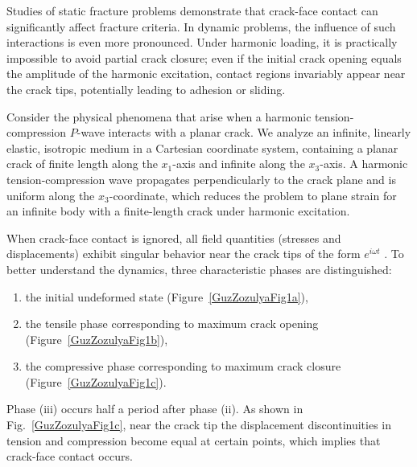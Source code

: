 Studies of static fracture problems demonstrate that crack-face contact can significantly affect fracture criteria.  
In dynamic problems, the influence of such interactions is even more pronounced.  
Under harmonic loading, it is practically impossible to avoid partial crack closure; even if the initial crack opening equals the amplitude of the harmonic excitation, contact regions invariably appear near the crack tips, potentially leading to adhesion or sliding.

Consider the physical phenomena that arise when a harmonic tension-compression $P$-wave interacts with a planar crack.  
We analyze an infinite, linearly elastic, isotropic medium in a Cartesian coordinate system, containing a planar crack of finite length along the $x_1$-axis and infinite along the $x_3$-axis.  
A harmonic tension-compression wave propagates perpendicularly to the crack plane and is uniform along the $x_3$-coordinate, which reduces the problem to plane strain for an infinite body with a finite-length crack under harmonic excitation.

When crack-face contact is ignored, all field quantities (stresses and displacements) exhibit singular behavior near the crack tips of the form $e^{i \omega t}$ \cite{GuzZozulyaRef15,GuzZozulyaRef24,GuzZozulyaRef27,GuzZozulyaRef28}.  
To better understand the dynamics, three characteristic phases are distinguished:

\begin{enumerate}[label=(\roman*)]
	\item the initial undeformed state (Figure~\ref{GuzZozulyaFig1a}),
	\item the tensile phase corresponding to maximum crack opening (Figure~\ref{GuzZozulyaFig1b}),
	\item the compressive phase corresponding to maximum crack closure (Figure~\ref{GuzZozulyaFig1c}).
\end{enumerate}

Phase (iii) occurs half a period after phase (ii).  
As shown in Fig.~\ref{GuzZozulyaFig1c}, near the crack tip the displacement discontinuities in tension and compression become equal at certain points, which implies that crack-face contact occurs.

